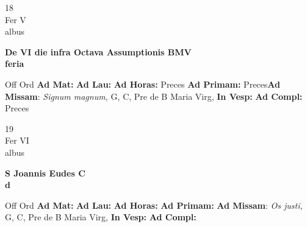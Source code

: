 \documentclass[10pt, openany]{book}
\begin{document}
    \begin{center}
        \begin{minipage}{3.5in}
            \vspace{2em}
            \begin{minipage}{0.5in}
                {\Huge 18} \\
                {\normalsize Fer V} \\
                {\normalsize albus}
            \end{minipage}
            \begin{minipage}{3.0in}
                \textbf{ \large De VI die infra Octava Assumptionis BMV \\
                \textnormal{\normalsize feria}} \\ 
            \end{minipage}
            \begin{justify}Off Ord
                \textbf{Ad Mat: }
                \textbf{Ad Lau: }
                \textbf{Ad Horas: }Preces
                \textbf{Ad Primam: }Preces\textbf{Ad Missam}: \textit{Signum magnum,} G, C, Pre de B Maria Virg,  
                \textbf{In Vesp: }
                \textbf{Ad Compl: }Preces
            \end{justify}
        \end{minipage}
    \end{center}

    \begin{center}
        \begin{minipage}{3.5in}
            \vspace{2em}
            \begin{minipage}{0.5in}
                {\Huge 19} \\
                {\normalsize Fer VI} \\
                {\normalsize albus}
            \end{minipage}
            \begin{minipage}{3.0in}
                \textbf{ \large S Joannis Eudes C \\
                \textnormal{\normalsize d}} \\ 
            \end{minipage}
            \begin{justify}Off Ord
                \textbf{Ad Mat: }
                \textbf{Ad Lau: }
                \textbf{Ad Horas: }
                \textbf{Ad Primam: }\textbf{Ad Missam}: \textit{Os justi,} G, C, Pre de B Maria Virg,  
                \textbf{In Vesp: }
                \textbf{Ad Compl: }
            \end{justify}
        \end{minipage}
    \end{center}
\end{document}
